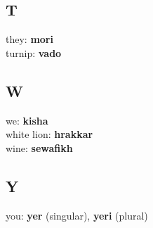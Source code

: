 \begin{multicols}{2}
\subsection*{T}
they: \textbf{mori} \\
turnip: \textbf{vado} \\
\subsection*{W}
we: \textbf{kisha} \\
white lion: \textbf{hrakkar} \\
wine: \textbf{sewafikh} \\
\subsection*{Y}
you: \textbf{yer} (singular), \textbf{yeri} (plural) \\
\end{multicols}
